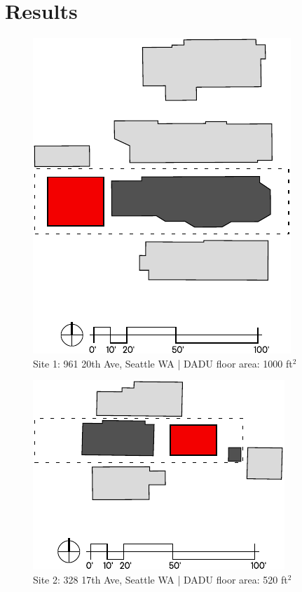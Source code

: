 \documentclass[sagev,times,Royal]{sagej}
\begin{document}
\section{Results}
\begin{figure}[h!]
\centering
\includegraphics{site1.pdf}
\caption{Site 1: 961 20th Ave, Seattle WA | DADU floor area: 1000 ft$^2$}
\label{site1-plan}
\end{figure}

\begin{figure}[h!]
\centering
\includegraphics{site2.pdf}
\caption{Site 2: 328 17th Ave, Seattle WA | DADU floor area: 520 ft$^2$}
\label{site2-plan}
\end{figure}
\end{document}

